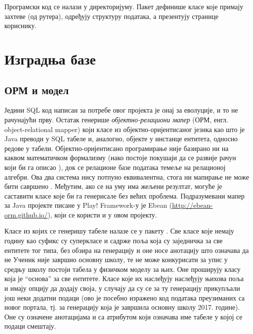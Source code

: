 Програмски код се налази у  директоријуму. Пакет  дефинише класе које примају захтеве (од рутера),  одређују структуру података, а  презентују странице кориснику.



\section{Изградња базе}\label{sec:4.4}

\subsection{ОРМ и модел}

Једини SQL код написан за потребе овог пројекта је онај за еволуције, и то не рачунајући прву. Остатак генерише \emph{објектно-релациони мапер} (ОРМ, енгл. object-relational mapper) који класе из објектно-оријентисаног језика као што је Java преводи у SQL табеле и, аналогно, објекте у инстанце ентитета, односно редове у табели. Објектно-оријентисано програмирање није базирано ни на каквом математичком формализму (иако постоје покушаји да се развије рачун који би га описао \citep{abadi2012theory}), док се релационе базе података темеље на релационој алгебри. Ова два система нису потпуно еквивалентна, стога ни мапирање не може бити савршено \citep{barnes2007object}. Међутим, ако се на уму има жељени резултат, могуће је саставити класе које би га генерисале без већих проблема. Подразумевани мапер за Java пројекте писане у Play! Framework-у је Ebean (\url{http://ebean-orm.github.io/}), који се користи и у овом пројекту.

Класе из којих се генеришу табеле налазе се у пакету . Све класе које немају годину као суфикс су суперкласе и садрже поља која су заједничка за све ентитете тог типа, без обзира на генерацију и оне носе анотацију  што означава да не
Ученик није завршио основну школу, те не може конкурисати за упис у средњу школу
 постоји табела у физичком моделу за њих. Оне проширују класу  која је \enquote{основа} за све ентитете. Класе које их наслеђују наслеђују њихова поља и имају опцију да додају своја, у случају да су се за ту генерацију прикупљали још неки додатни подаци (ово је посебно изражено код података преузиманих са новог портала, тј. за генерацију која је завршила основну школу 2017. године). Оне су означене анотацијама  и  са атрибутом  који означава име табеле у којој се подаци смештају.

